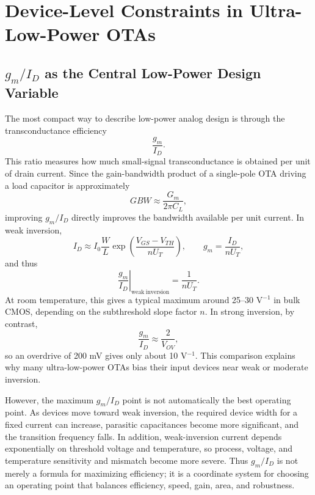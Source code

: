\documentclass[conference,a4paper]{IEEEtran}
\begin{document}
\section{Device-Level Constraints in Ultra-Low-Power OTAs}
\subsection{\texorpdfstring{$g_m/I_D$}{gm/ID} as the Central Low-Power Design Variable}
The most compact way to describe low-power analog design is through the transconductance efficiency \cite{silveira1996gmid,enz1995ekv}
\begin{equation}
  \frac{g_m}{I_D}.
\end{equation}
This ratio measures how much small-signal transconductance is obtained per unit of drain current. Since the gain-bandwidth product of a single-pole OTA driving a load capacitor is approximately
\begin{equation}
  GBW \approx \frac{G_m}{2\pi C_L},
\end{equation}
improving $g_m/I_D$ directly improves the bandwidth available per unit current. In weak inversion,
\begin{equation}
  I_D \approx I_0\frac{W}{L}\exp\left(\frac{V_{GS}-V_{TH}}{nU_T}\right),
  \qquad
  g_m=\frac{I_D}{nU_T},
\end{equation}
and thus
\begin{equation}
  \left.\frac{g_m}{I_D}\right|_{\mathrm{weak\ inversion}}=\frac{1}{nU_T}.
\end{equation}
At room temperature, this gives a typical maximum around 25--30 V$^{-1}$ in bulk CMOS, depending on the subthreshold slope factor $n$. In strong inversion, by contrast,
\begin{equation}
  \frac{g_m}{I_D}\approx\frac{2}{V_{OV}},
\end{equation}
so an overdrive of 200 mV gives only about 10 V$^{-1}$. This comparison explains why many ultra-low-power OTAs bias their input devices near weak or moderate inversion.

However, the maximum $g_m/I_D$ point is not automatically the best operating point. As devices move toward weak inversion, the required device width for a fixed current can increase, parasitic capacitances become more significant, and the transition frequency falls. In addition, weak-inversion current depends exponentially on threshold voltage and temperature, so process, voltage, and temperature sensitivity and mismatch become more severe. Thus $g_m/I_D$ is not merely a formula for maximizing efficiency; it is a coordinate system for choosing an operating point that balances efficiency, speed, gain, area, and robustness.
\end{document}
